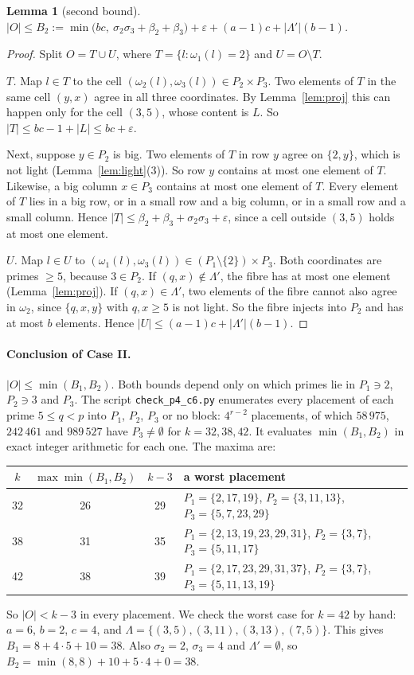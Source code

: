 \documentclass[11pt]{article}
\newtheorem{lemma}[theorem]{Lemma}
\theoremstyle{definition}
\theoremstyle{remark}
\begin{document}
\begin{lemma}[second bound]\label{lem:B2}
$|O|\le B_2:=\min\bigl(bc,\ \sigma_2\sigma_3+\beta_2+\beta_3\bigr)+\varepsilon+(a-1)c+|\Lambda'|(b-1)$.
\end{lemma}
\begin{proof}
Split $O=T\cup U$, where $T=\{l:\omega_1(l)=2\}$ and $U=O\setminus T$.

\emph{$T$.} Map $l\in T$ to the cell $(\omega_2(l),\omega_3(l))\in P_2\times P_3$. Two elements of
$T$ in the same cell $(y,x)$ agree in all three coordinates. By Lemma~\ref{lem:proj} this can
happen only for the cell $(3,5)$, whose content is $L$. So $|T|\le bc-1+|L|\le bc+\varepsilon$.

Next, suppose $y\in P_2$ is big. Two elements of $T$ in row $y$ agree on $\{2,y\}$, which is not
light (Lemma~\ref{lem:light}(3)). So row $y$ contains at most one element of $T$. Likewise, a big
column $x\in P_3$ contains at most one element of $T$. Every element of $T$ lies in a big row, or
in a small row and a big column, or in a small row and a small column. Hence
$|T|\le\beta_2+\beta_3+\sigma_2\sigma_3+\varepsilon$, since a cell outside $(3,5)$ holds at most one
element.

\emph{$U$.} Map $l\in U$ to $(\omega_1(l),\omega_3(l))\in(P_1\setminus\{2\})\times P_3$. Both
coordinates are primes $\ge5$, because $3\in P_2$. If $(q,x)\notin\Lambda'$, the fibre has at most
one element (Lemma~\ref{lem:proj}). If $(q,x)\in\Lambda'$, two elements of the fibre cannot also
agree in $\omega_2$, since $\{q,x,y\}$ with $q,x\ge5$ is not light. So the fibre injects into
$P_2$ and has at most $b$ elements. Hence $|U|\le(a-1)c+|\Lambda'|(b-1)$.
\end{proof}

\paragraph{Conclusion of Case II.} $|O|\le\min(B_1,B_2)$. Both bounds depend only on which
primes lie in $P_1\ni2$, $P_2\ni3$ and $P_3$. The script \texttt{check\_p4\_c6.py} enumerates
every placement of each prime $5\le q<p$ into $P_1$, $P_2$, $P_3$ or no block: $4^{r-2}$
placements, of which $58\,975$, $242\,461$ and $989\,527$ have $P_3\ne\emptyset$ for
$k=32,38,42$. It evaluates $\min(B_1,B_2)$ in exact integer arithmetic for each one. The maxima are:
\begin{center}
\begin{tabular}{c|c|c|l}
$k$ & $\max\min(B_1,B_2)$ & $k-3$ & a worst placement\\\hline
32 & 26 & 29 & $P_1=\{2,17,19\}$, $P_2=\{3,11,13\}$, $P_3=\{5,7,23,29\}$\\
38 & 31 & 35 & $P_1=\{2,13,19,23,29,31\}$, $P_2=\{3,7\}$, $P_3=\{5,11,17\}$\\
42 & 38 & 39 & $P_1=\{2,17,23,29,31,37\}$, $P_2=\{3,7\}$, $P_3=\{5,11,13,19\}$
\end{tabular}
\end{center}
So $|O|<k-3$ in every placement. We check the worst case for $k=42$ by hand: $a=6$,
$b=2$, $c=4$, and $\Lambda=\{(3,5),(3,11),(3,13),(7,5)\}$. This gives
$B_1=8+4\cdot5+10=38$. Also $\sigma_2=2$, $\sigma_3=4$ and $\Lambda'=\emptyset$, so
$B_2=\min(8,8)+10+5\cdot4+0=38$.
\end{document}
